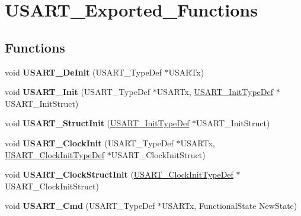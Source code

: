 \hypertarget{group__USART__Exported__Functions}{
\section{USART\_\-Exported\_\-Functions}
\label{group__USART__Exported__Functions}
}
\subsection*{Functions}
\begin{DoxyCompactItemize}
\item 
\hypertarget{group__USART__Exported__Functions_ga2f8e1ce72da21b6539d8e1f299ec3b0d}{
void {\bfseries USART\_\-DeInit} (USART\_\-TypeDef $\ast$USARTx)}
\label{group__USART__Exported__Functions_ga2f8e1ce72da21b6539d8e1f299ec3b0d}

\item 
\hypertarget{group__USART__Exported__Functions_ga98da340ea0324002ba1b4263e91ab2ff}{
void {\bfseries USART\_\-Init} (USART\_\-TypeDef $\ast$USARTx, \hyperlink{structUSART__InitTypeDef}{USART\_\-InitTypeDef} $\ast$USART\_\-InitStruct)}
\label{group__USART__Exported__Functions_ga98da340ea0324002ba1b4263e91ab2ff}

\item 
\hypertarget{group__USART__Exported__Functions_ga34e1faa2f312496c16cfd05155f4c8b1}{
void {\bfseries USART\_\-StructInit} (\hyperlink{structUSART__InitTypeDef}{USART\_\-InitTypeDef} $\ast$USART\_\-InitStruct)}
\label{group__USART__Exported__Functions_ga34e1faa2f312496c16cfd05155f4c8b1}

\item 
\hypertarget{group__USART__Exported__Functions_gadb50c7a2175c91acd3728f8eefd0c63d}{
void {\bfseries USART\_\-ClockInit} (USART\_\-TypeDef $\ast$USARTx, \hyperlink{structUSART__ClockInitTypeDef}{USART\_\-ClockInitTypeDef} $\ast$USART\_\-ClockInitStruct)}
\label{group__USART__Exported__Functions_gadb50c7a2175c91acd3728f8eefd0c63d}

\item 
\hypertarget{group__USART__Exported__Functions_ga59df27d0adda18b16ee28d47672cc724}{
void {\bfseries USART\_\-ClockStructInit} (\hyperlink{structUSART__ClockInitTypeDef}{USART\_\-ClockInitTypeDef} $\ast$USART\_\-ClockInitStruct)}
\label{group__USART__Exported__Functions_ga59df27d0adda18b16ee28d47672cc724}

\item 
\hypertarget{group__USART__Exported__Functions_ga45e51626739c5f22a6567c8a85d1d85e}{
void {\bfseries USART\_\-Cmd} (USART\_\-TypeDef $\ast$USARTx, FunctionalState NewState)}
\label{group__USART__Exported__Functions_ga45e51626739c5f22a6567c8a85d1d85e}


\end{DoxyCompactItemize}
